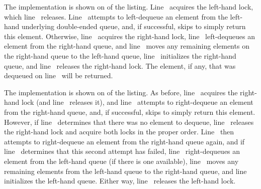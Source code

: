 \begin{fcvref}
The  implementation is shown on
of the listing.
Line~ acquires the left-hand lock,
which line~ releases.
Line~ attempts to left-dequeue an element
from the left-hand underlying
double-ended queue, and, if successful,
skips  to simply
return this element.
Otherwise, line~ acquires the right-hand lock, line~
left-dequeues an element from the right-hand queue,
and line~ moves any remaining elements on the right-hand
queue to the left-hand queue, line~ initializes
the right-hand queue,
and line~ releases the right-hand lock.
The element, if any, that was dequeued on line~ will be returned.
\end{fcvref}

\begin{fcvref}
The  implementation is shown on 
of the listing.
As before, line~ acquires the right-hand lock
(and line~
releases it), and line~ attempts to right-dequeue an element
from the right-hand queue, and, if successful,
skips 
to simply return this element.
However, if line~ determines that there was no element to dequeue,
line~ releases the right-hand lock and
 acquire both
locks in the proper order.
Line~ then attempts to right-dequeue an element
from the right-hand
queue again, and if line~ determines that this second attempt has
failed, line~ right-dequeues an element from the left-hand queue
(if there is one available), line~ moves any remaining elements
from the left-hand queue to the right-hand queue, and line~
initializes the left-hand queue.
Either way, line~ releases the left-hand lock.
\end{fcvref}

